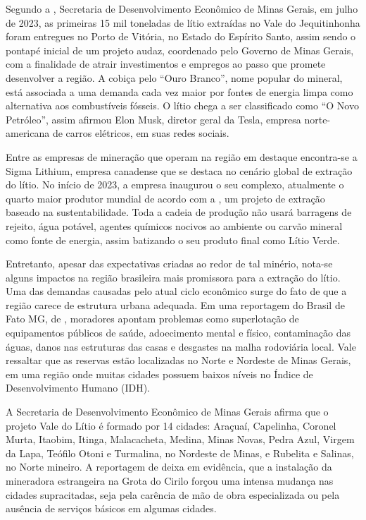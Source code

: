 Segundo a , Secretaria de Desenvolvimento Econômico de Minas Gerais, em julho de 2023, as primeiras 15 mil toneladas de lítio extraídas no Vale do Jequitinhonha foram entregues no Porto de Vitória, no Estado do Espírito Santo, assim sendo o pontapé inicial de um projeto audaz, coordenado pelo Governo de Minas Gerais, com a finalidade de atrair investimentos e empregos ao passo que promete desenvolver a região. A cobiça pelo “Ouro Branco”, nome popular do mineral, está associada a uma demanda cada vez maior por fontes de energia limpa como alternativa aos combustíveis fósseis. O lítio chega a ser classificado como “O Novo Petróleo”, assim afirmou Elon Musk, diretor geral da Tesla, empresa norte-americana de carros elétricos, em suas redes sociais.

Entre as empresas de mineração que operam na região em destaque encontra-se a Sigma Lithium, empresa canadense que se destaca no cenário global de extração do lítio. No início de 2023, a empresa inaugurou o seu complexo, atualmente o quarto maior produtor mundial de acordo com a , um projeto de extração baseado na sustentabilidade. Toda a cadeia de produção não usará barragens de rejeito, água potável, agentes químicos nocivos ao ambiente ou carvão mineral como fonte de energia, assim batizando o seu produto final como Lítio Verde.

Entretanto, apesar das expectativas criadas ao redor de tal minério, nota-se alguns impactos na região brasileira mais promissora para a extração do lítio. Uma das demandas causadas pelo atual ciclo econômico surge do fato de que a região carece de estrutura urbana adequada. Em uma reportagem do Brasil de Fato MG, de \cite{BrasildeFatoProblemadaMineracao}, moradores apontam problemas como superlotação de equipamentos públicos de saúde, adoecimento mental e físico, contaminação das águas, danos nas estruturas das casas e desgastes na malha rodoviária local. Vale ressaltar que as reservas estão localizadas no Norte e Nordeste de Minas Gerais, em uma região onde muitas cidades possuem baixos níveis no Índice de Desenvolvimento Humano (IDH).

A Secretaria de Desenvolvimento Econômico de Minas Gerais afirma que o projeto Vale do Lítio é formado por 14 cidades: Araçuaí, Capelinha, Coronel Murta, Itaobim, Itinga, Malacacheta, Medina, Minas Novas, Pedra Azul, Virgem da Lapa, Teófilo Otoni e Turmalina, no Nordeste de Minas, e Rubelita e Salinas, no Norte mineiro. A reportagem de  deixa em evidência, que a instalação da mineradora estrangeira na Grota do Cirilo forçou uma intensa mudança nas cidades supracitadas, seja pela carência de mão de obra especializada ou pela ausência de serviços básicos em algumas cidades.

